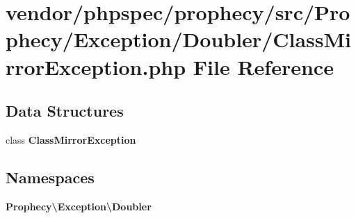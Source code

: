 \section{vendor/phpspec/prophecy/src/\+Prophecy/\+Exception/\+Doubler/\+Class\+Mirror\+Exception.php File Reference}
\label{_class_mirror_exception_8php}
\subsection*{Data Structures}
\begin{DoxyCompactItemize}
\item 
class {\bf Class\+Mirror\+Exception}
\end{DoxyCompactItemize}
\subsection*{Namespaces}
\begin{DoxyCompactItemize}
\item 
 {\bf Prophecy\textbackslash{}\+Exception\textbackslash{}\+Doubler}
\end{DoxyCompactItemize}
